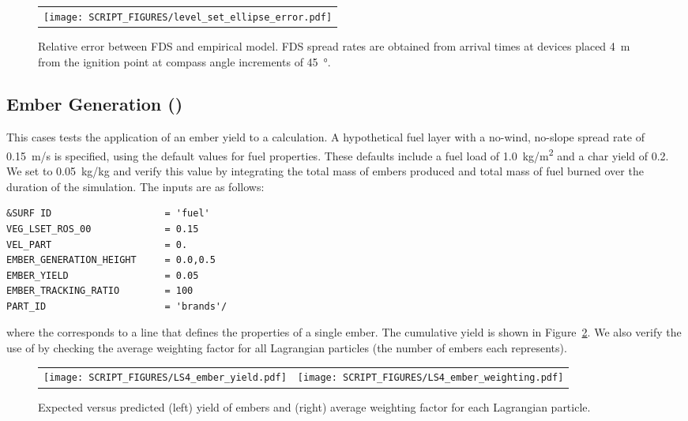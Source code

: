 \documentclass[11pt]{book}
\begin{document}
\begin{figure}[h]
\begin{center}
\begin{tabular}{c}
 \texttt{[image: SCRIPT\_FIGURES/level\_set\_ellipse\_error.pdf]}
\end{tabular}
\end{center}
 \caption[Level set fire front ellipse error]{Relative error between FDS and empirical model. FDS spread rates are obtained from arrival times at devices placed \SI{4}{\meter} from the ignition point at compass angle increments of \SI{45}{\degree}.}
\label{fig:level_set_ellipse_error}
\end{figure}

\subsection{Ember Generation (\texorpdfstring{}{LS4\_ember\_yield})}
\label{LS4_ember_yield}

This cases tests the application of an ember yield to a  calculation. A hypothetical fuel layer with a no-wind, no-slope spread rate of 0.15~m/s is specified, using the default values for fuel properties. These defaults include a fuel load of 1.0~\unit{kg/m^2} and a char yield of 0.2. We set  to 0.05~kg/kg and verify this value by integrating the total mass of embers produced and total mass of fuel burned over the duration of the simulation. The inputs are as follows:
\begin{lstlisting}
&SURF ID                    = 'fuel'
VEG_LSET_ROS_00             = 0.15
VEL_PART                    = 0.
EMBER_GENERATION_HEIGHT     = 0.0,0.5
EMBER_YIELD                 = 0.05
EMBER_TRACKING_RATIO        = 100
PART_ID                     = 'brands'/
\end{lstlisting}
where the  corresponds to a  line that defines the properties of a single ember. The cumulative yield is shown in Figure~\ref{fig:LS4_ember_yield}. We also verify the use of  by checking the average weighting factor for all Lagrangian particles (the number of embers each represents).

\begin{figure}[h]
\begin{center}
\begin{tabular}{cc}
 \texttt{[image: SCRIPT\_FIGURES/LS4\_ember\_yield.pdf]}&
 \texttt{[image: SCRIPT\_FIGURES/LS4\_ember\_weighting.pdf]}\\
\end{tabular}
\end{center}
 \caption[Level set ember generation]{Expected versus predicted (left) yield of embers and (right) average weighting factor for each Lagrangian particle.}
\label{fig:LS4_ember_yield}
\end{figure}
\end{document}
